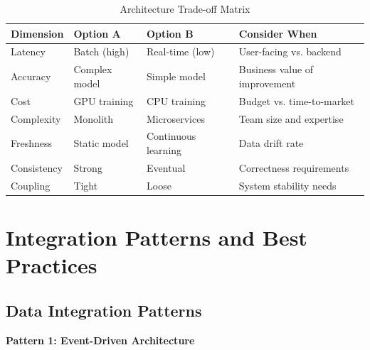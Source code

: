 \begin{table}[h]
\centering
\caption{Architecture Trade-off Matrix}
\begin{tabular}{p{3cm}p{3cm}p{3cm}p{3cm}}
\toprule
\textbf{Dimension} & \textbf{Option A} & \textbf{Option B} & \textbf{Consider When} \\
\midrule
Latency & Batch (high) & Real-time (low) & User-facing vs. backend \\
\midrule
Accuracy & Complex model & Simple model & Business value of improvement \\
\midrule
Cost & GPU training & CPU training & Budget vs. time-to-market \\
\midrule
Complexity & Monolith & Microservices & Team size and expertise \\
\midrule
Freshness & Static model & Continuous learning & Data drift rate \\
\midrule
Consistency & Strong & Eventual & Correctness requirements \\
\midrule
Coupling & Tight & Loose & System stability needs \\
\bottomrule
\end{tabular}
\end{table}

\section{Integration Patterns and Best Practices}

\subsection{Data Integration Patterns}

\textbf{Pattern 1: Event-Driven Architecture}

